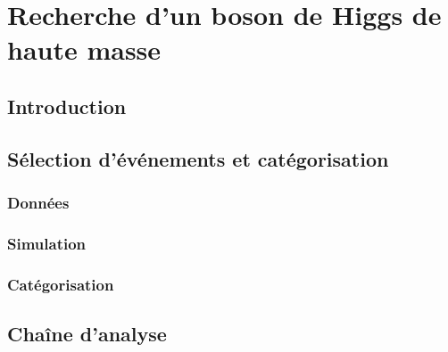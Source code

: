 \chapter{Recherche d'un boson de Higgs de haute masse}\label{chapter-HTT_analysis}

\section{Introduction}\label{chapter-HTT_analysis-section-introduction}

\section{Sélection d'événements et catégorisation}\label{chapter-HTT_analysis-section-evt_selection}
\subsection{Données}\label{chapter-HTT_analysis-section-evt_selection-subsec-data}
\subsection{Simulation}\label{chapter-HTT_analysis-section-evt_selection-subsec-MC}
\subsection{Catégorisation}\label{chapter-HTT_analysis-section-evt_selection-subsec-categorisation}

\section{Chaîne d'analyse}\label{chapter-HTT_analysis-section-chaine_analyse}

